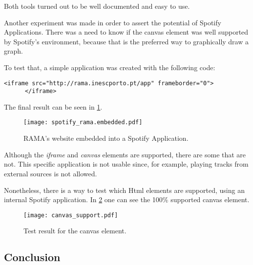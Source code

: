     Both tools turned out to be well documented and easy to use.


    Another experiment was made in order to assert the potential of Spotify Applications.
    There was a need to know if the canvas element was well supported by Spotify's environment, because that is the preferred way to graphically draw a graph.

    To test that, a simple application was created with the following code:

    \begin{lstlisting}[caption={\emph{iframe} element that allows to embed RAMA's website into the application.}, style=htmlcssjs]
      <iframe src="http://rama.inescporto.pt/app" frameborder="0">
      </iframe>\end{lstlisting}

    The final result can be seen in \ref{fig:rama_spotifyed}.

    \begin{figure}
      \begin{center}
        \texttt{[image: spotify\_rama.embedded.pdf]}
      \end{center}
      \caption{RAMA's website embedded into a Spotify Application.}
      \label{fig:rama_spotifyed}
    \end{figure}

    Although the \emph{iframe} and \emph{canvas} elements are supported, there are some that are not.
    This specific application is not usable since, for example, playing tracks from external sources is not allowed.

    Nonetheless, there is a way to test which Html elements are supported, using an internal Spotify application.
    In \ref{fig:canvas_support} one can see the 100\% supported canvas element.

    \begin{figure}
       \begin{center}
         \texttt{[image: canvas\_support.pdf]}
       \end{center}
       \caption{Test result for the canvas element.}
       \label{fig:canvas_support}
     \end{figure}


  \subsection{Conclusion} %
  \label{sub:conclusion}

